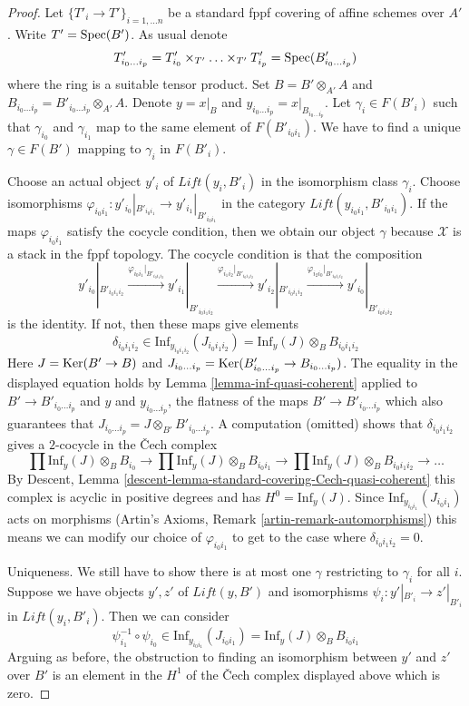 \begin{proof}
Let $\{T'_i \to T'\}_{i = 1, \ldots n}$ be a standard fppf covering
of affine schemes over $A'$. Write $T' = \mathop{\mathrm{Spec}}(B')$. As usual denote
$$
T'_{i_0 \ldots i_p} =
T'_{i_0} \times_{T'} \ldots \times_{T'} T'_{i_p} = \mathop{\mathrm{Spec}}(B'_{i_0 \ldots i_p})
$$
where the ring is a suitable tensor product.
Set $B = B' \otimes_{A'} A$ and
$B_{i_0 \ldots i_p} = B'_{i_0 \ldots i_p} \otimes_{A'} A$.
Denote $y = x|_B$ and $y_{i_0 \ldots i_p} = x|_{B_{i_0 \ldots i_p}}$.
Let $\gamma_i \in F(B'_i)$ such that $\gamma_{i_0}$ and $\gamma_{i_1}$
map to the same element of $F(B'_{i_0i_1})$.
We have to find a unique $\gamma \in F(B')$ mapping to
$\gamma_i$ in $F(B'_i)$.

\medskip\noindent
Choose an actual object $y'_i$ of $\textit{Lift}(y_i, B'_i)$
in the isomorphism class $\gamma_i$.
Choose isomorphisms
$\varphi_{i_0i_1} : y'_{i_0}|_{B'_{i_0i_1}} \to y'_{i_1}|_{B'_{i_0i_1}}$
in the category $\textit{Lift}(y_{i_0i_1}, B'_{i_0i_1})$.
If the maps $\varphi_{i_0i_1}$ satisfy the cocycle condition,
then we obtain our object $\gamma$ because $\mathcal{X}$ is
a stack in the fppf topology. The cocycle condition is that the
composition
$$
y'_{i_0}|_{B'_{i_0i_1i_2}}
\xrightarrow{\varphi_{i_0i_1}|_{B'_{i_0i_1i_2}}}
y'_{i_1}|_{B'_{i_0i_1i_2}}
\xrightarrow{\varphi_{i_1i_2}|_{B'_{i_0i_1i_2}}}
y'_{i_2}|_{B'_{i_0i_1i_2}}
\xrightarrow{\varphi_{i_2i_0}|_{B'_{i_0i_1i_2}}}
y'_{i_0}|_{B'_{i_0i_1i_2}}
$$
is the identity. If not, then these maps give elements
$$
\delta_{i_0i_1i_2} \in
\text{Inf}_{y_{i_0i_1i_2}}(J_{i_0i_1i_2}) =
\text{Inf}_y(J) \otimes_B B_{i_0i_1i_2}
$$
Here $J = \mathop{\mathrm{Ker}}(B' \to B)$ and
$J_{i_0 \ldots i_p} = \mathop{\mathrm{Ker}}(B'_{i_0 \ldots i_p} \to B_{i_0 \ldots i_p})$.
The equality in the displayed equation holds by
Lemma \ref{lemma-inf-quasi-coherent} applied to
$B' \to B'_{i_0 \ldots i_p}$ and $y$ and $y_{i_0 \ldots i_p}$,
the flatness of the maps $B' \to B'_{i_0 \ldots i_p}$
which also guarantees that
$J_{i_0 \ldots i_p} = J \otimes_{B'} B'_{i_0 \ldots i_p}$.
A computation (omitted) shows that $\delta_{i_0i_1i_2}$ gives
a $2$-cocycle in the {\v C}ech complex
$$
\prod \text{Inf}_y(J) \otimes_B B_{i_0} \to
\prod \text{Inf}_y(J) \otimes_B B_{i_0i_1} \to
\prod \text{Inf}_y(J) \otimes_B B_{i_0i_1i_2} \to \ldots
$$
By Descent, Lemma \ref{descent-lemma-standard-covering-Cech-quasi-coherent}
this complex is acyclic in positive degrees and has $H^0 = \text{Inf}_y(J)$.
Since $\text{Inf}_{y_{i_0i_1}}(J_{i_0i_1})$ acts on
morphisms (Artin's Axioms, Remark \ref{artin-remark-automorphisms})
this means we can modify our choice of $\varphi_{i_0i_1}$
to get to the case where $\delta_{i_0i_1i_2} = 0$.

\medskip\noindent
Uniqueness. We still have to show there is at most one $\gamma$ restricting
to $\gamma_i$ for all $i$. Suppose we have objects $y', z'$ of
$\textit{Lift}(y, B')$ and isomorphisms $\psi_i : y'|_{B'_i} \to z'|_{B'_i}$
in $\textit{Lift}(y_i, B'_i)$. Then we can consider
$$
\psi_{i_1}^{-1} \circ \psi_{i_0} \in
\text{Inf}_{y_{i_0i_1}}(J_{i_0i_1}) =
\text{Inf}_y(J) \otimes_B B_{i_0i_1}
$$
Arguing as before, the obstruction to finding an isomorphism between
$y'$ and $z'$ over $B'$ is an element in the $H^1$ of the
{\v C}ech complex displayed above which is zero.
\end{proof}

